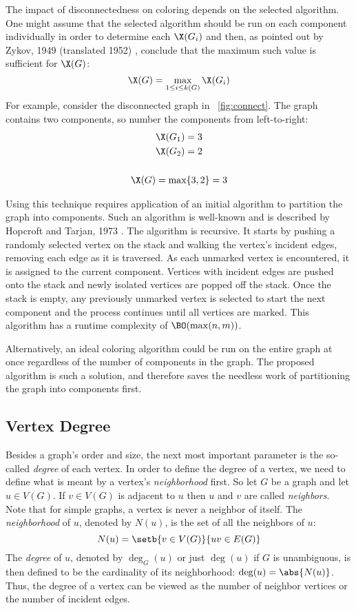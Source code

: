 The impact of disconnectedness on coloring depends on the selected algorithm.  One might assume that the selected
algorithm should be run on each component individually in order to determine each \(\X(G_i)\) and then, as pointed
out by Zykov, 1949 (translated 1952) \cite{zykov}, conclude that the maximum such value is sufficient for \(\X(G)\):
\[\X(G)=\max_{1\le i\le k(G)}\X(G_i)\]
For example, consider the disconnected graph in \figurename~\ref{fig:connect}.  The graph contains two components,
so number the components from left-to-right:
\begin{gather*}
  \X(G_1)=3 \\
  \X(G_2)=2 \\
  \\
  \X(G)=\max\{3,2\}=3
\end{gather*}

Using this technique requires application of an initial algorithm to partition the graph into components.  Such an
algorithm is well-known and is described by Hopcroft and Tarjan, 1973 \cite{hopcroft}.  The algorithm is recursive.
It starts by pushing a randomly selected vertex on the stack and walking the vertex's incident edges, removing each
edge as it is traversed.  As each unmarked vertex is encountered, it is assigned to the current component.
Vertices with incident edges are pushed onto the stack and newly isolated vertices are popped off the stack.  Once
the stack is empty, any previously unmarked vertex is selected to start the next component and the process
continues until all vertices are marked.  This algorithm has a runtime complexity of \(\BO(\max(n,m))\).

Alternatively, an ideal coloring algorithm could be run on the entire graph at once regardless of the number of
components in the graph.  The proposed algorithm is such a solution, and therefore saves the needless work of
partitioning the graph into components first.

\subsection{Vertex Degree}\label{sec:sub:degree}

Besides a graph's order and size, the next most important parameter is the so-called \emph{degree} of each vertex.
In order to define the degree of a vertex, we need to define what is meant by a vertex's \emph{neighborhood} first.
So let \(G\) be a graph and let \(u\in V(G)\).  If \(v\in V(G)\) is adjacent to \(u\) then \(u\) and \(v\) are
called \emph{neighbors}.  Note that for simple graphs, a vertex is never a neighbor of itself.  The
\emph{neighborhood} of \(u\), denoted by \(N(u)\), is the set of all the neighbors of \(u\):
\[N(u)=\setb{v\in V(G)}{uv\in E(G)}\]
The \emph{degree} of \(u\), denoted by \(\deg_G(u)\) or just \(\deg(u)\) if \(G\) is unambiguous, is then defined
to be the cardinality of its neighborhood: \(\deg(u)=\abs{N(u)}\).  Thus, the degree of a vertex can be viewed as
the number of neighbor vertices or the number of incident edges.

